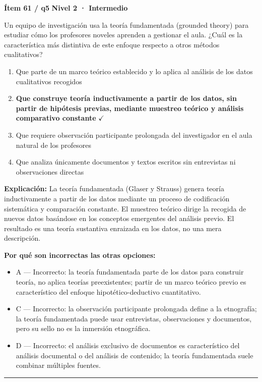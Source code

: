 \documentclass[12pt,a4paper]{article}
\begin{document}
\begin{mdframed}[backgroundcolor=fondogris,linecolor=ambar,linewidth=1pt,innerleftmargin=10pt,innerrightmargin=10pt,innertopmargin=7pt,innerbottommargin=7pt]
\textbf{Ítem 61 / q5} \hfill {\small\bfseries\color{ambar} Nivel 2 · Intermedio}
\end{mdframed}

Un equipo de investigación usa la teoría fundamentada (grounded theory) para estudiar cómo los profesores noveles aprenden a gestionar el aula. ¿Cuál es la característica más distintiva de este enfoque respecto a otros métodos cualitativos?

\begin{enumerate}
  \item[A.] Que parte de un marco teórico establecido y lo aplica al análisis de los datos cualitativos recogidos
  \item[\textbf{\color{verde}B.}] \textbf{\color{verde} Que construye teoría inductivamente a partir de los datos, sin partir de hipótesis previas, mediante muestreo teórico y análisis comparativo constante} \hfill $\checkmark$
  \item[C.] Que requiere observación participante prolongada del investigador en el aula natural de los profesores
  \item[D.] Que analiza únicamente documentos y textos escritos sin entrevistas ni observaciones directas
\end{enumerate}

\noindent\textbf{\color{azul}Explicación:} La teoría fundamentada (Glaser y Strauss) genera teoría inductivamente a partir de los datos mediante un proceso de codificación sistemática y comparación constante. El muestreo teórico dirige la recogida de nuevos datos basándose en los conceptos emergentes del análisis previo. El resultado es una teoría sustantiva enraizada en los datos, no una mera descripción.

\noindent\textbf{\color{gris}Por qué son incorrectas las otras opciones:}
\begin{itemize}
  \item {\small A — Incorrecto: la teoría fundamentada parte de los datos para construir teoría, no aplica teorías preexistentes; partir de un marco teórico previo es característico del enfoque hipotético-deductivo cuantitativo.}
  \item {\small C — Incorrecto: la observación participante prolongada define a la etnografía; la teoría fundamentada puede usar entrevistas, observaciones y documentos, pero su sello no es la inmersión etnográfica.}
  \item {\small D — Incorrecto: el análisis exclusivo de documentos es característico del análisis documental o del análisis de contenido; la teoría fundamentada suele combinar múltiples fuentes.}
\end{itemize}
\vspace{8pt}\hrule\vspace{10pt}
\end{document}
